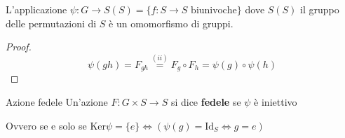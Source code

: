 \begin{proposition}

L'applicazione \(\psi : G \to S(S) = \{f : S\to S \text{ biunivoche}\}\) dove
\(S{(S)}\) il gruppo delle permutazioni di \(S\) è un omomorfismo di gruppi.
\end{proposition}
\begin{proof}
\[
    \psi{(gh)}= F_{gh} \overset{(ii)}{=} F_g \circ F_h = \psi{(g)} \circ
    \psi{(h)}
\]
\end{proof}
\begin{definition}{Azione fedele}
    Un'azione \(F : G \times S \to S\) si dice \textbf{fedele} se \(\psi\) è
    iniettivo
\end{definition}
\begin{remark}
    Ovvero se e solo se \(\mathrm{Ker}\psi = \{e\} \iff (\psi{(g)} = \mathrm{Id}_S
    \iff g = e)\) 
\end{remark}

